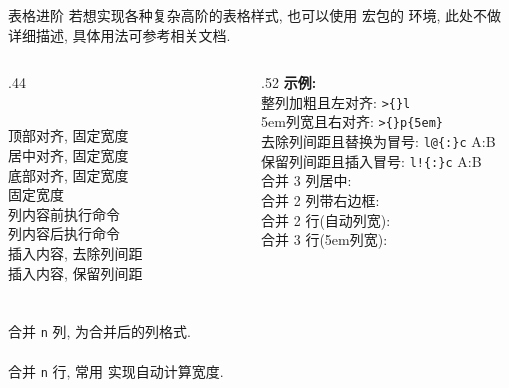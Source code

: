 \begin{frame}{表格进阶}
	若想实现各种复杂高阶的表格样式, 也可以使用  宏包的  环境, 此处不做详细描述, 具体用法可参考相关文档.\\
	\begin{columns}[T, onlytextwidth]
		\begin{column}{.44\textwidth}

			\\[1ex]
			 \hfill 顶部对齐, 固定宽度\\[.1ex]
			 \hfill 居中对齐, 固定宽度\\[.1ex]
			 \hfill 底部对齐, 固定宽度\\[.1ex]
			 \hfill 固定宽度\\[.1ex]
			\fverb{>} \hfill 列内容前执行命令\\[.1ex]
			\fverb{<} \hfill 列内容后执行命令\\[.1ex]
			 \hfill 插入内容, 去除列间距\\[.1ex]
			\fverb{!} \hfill 插入内容, 保留列间距\\[2ex]

			\\[1ex]
			\\[.1ex]
			合并 \texttt{n} 列,  为合并后的列格式.\\[.5ex]
			\\[.1ex]
			合并 \texttt{n} 行,  常用 \fverb{*} 实现自动计算宽度.
		\end{column}\hspace*{1.5em}
		\begin{column}{.52\textwidth}
			\textbf{示例:}\\[1ex]
			整列加粗且左对齐: \texttt{>\{\}l}\\[.5ex]
			5em列宽且右对齐: \texttt{>\{\}p\{5em\}}\\[.5ex]
			去除列间距且替换为冒号: \texttt{l@\{:\}c} \hfill A:B\\[.5ex]
			保留列间距且插入冒号: \texttt{l!\{:\}c} \hfill A\quad:\quad{}B\\[1ex]
			合并 3 列居中: \\[.5ex]
			合并 2 列带右边框: \\[.5ex]
			合并 2 行(自动列宽): \marg*{*}\\[.5ex]
			合并 3 行(5em列宽): \marg*{5em}\\[.5ex]


\end{column}
\end{columns}
\end{frame}
